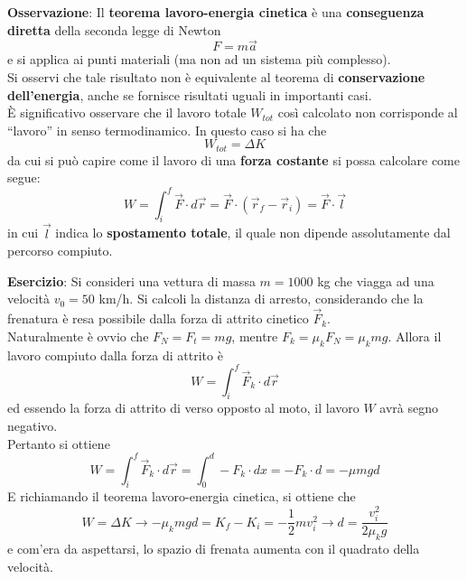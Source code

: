 \documentclass[a4paper]{extarticle}
\newcommand{\quotes}[1]{``#1''}
\begin{document}
\vspace{1em}
\noindent
\textbf{Osservazione}: Il \textbf{teorema lavoro-energia cinetica} è una \textbf{conseguenza diretta} della seconda legge di Newton
\[F = m \vec a\]
e si applica ai punti materiali (ma non ad un sistema più complesso).\\
Si osservi che tale risultato non è equivalente al teorema di \textbf{conservazione dell'energia}, anche se fornisce risultati uguali in importanti casi.\\
È significativo osservare che il lavoro totale $W_{tot}$ così calcolato non corrisponde al \quotes{lavoro} in senso termodinamico. In questo caso si ha che
\[W_{tot} = \Delta K\]
da cui si può capire come il lavoro di una \textbf{forza costante} si possa calcolare come segue:
\[\boxed{W = \int_i^f \vec F \cdot d \vec r = \vec F \cdot (\vec r_f - \vec r_i) = \vec F \cdot \vec l}\]
in cui $\vec l$ indica lo \textbf{spostamento totale}, il quale non dipende assolutamente dal percorso compiuto.

\vspace{1em}
\noindent
\textbf{Esercizio}: Si consideri una vettura di massa $m=1000$ kg che viagga ad una velocità $v_0=50$ km/h. Si calcoli la distanza di arresto, considerando che la frenatura è resa possibile dalla forza di attrito cinetico $\vec F_k$.\\
Naturalmente è ovvio che $F_N=F_t=mg$, mentre $F_k=\mu_k F_N=\mu_k mg$. Allora il lavoro compiuto dalla forza di attrito è
\[W = \int_i^f \vec F_k \cdot d \vec r\]
ed essendo la forza di attrito di verso opposto al moto, il lavoro $W$ avrà segno negativo.\\
Pertanto si ottiene
\[W = \int_i^f \vec F_k \cdot d \vec r = \int_0^d -F_k \cdot dx = -F_k \cdot d = -\mu m g d\]
E richiamando il teorema lavoro-energia cinetica, si ottiene che
\[W=\Delta K \longrightarrow -\mu_k m g d = K_f-K_i=-\frac{1}{2}mv_i^2\longrightarrow d=\frac{v_i^2}{2\mu_k g}\]
e com'era da aspettarsi, lo spazio di frenata aumenta con il quadrato della velocità.
\end{document}
